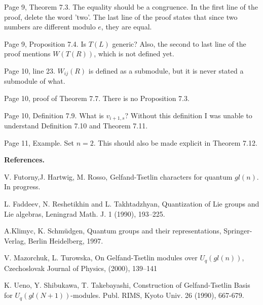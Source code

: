 \documentclass[11pt,fleqn]{article}
\begin{document}
Page 9, Theorem 7.3. The equality should be a congruence. In the first line of 
the proof, delete the word 'two'. The last line of the proof states that since
two numbers are different modulo $e$, they are equal.

Page 9, Proposition 7.4. Is $T(L)$ generic? Also, the second to last line of 
the proof mentions $W(T(R))$, which is not defined yet.

Page 10, line 23. $W_{ij}(R)$ is defined as a submodule, but it is never stated
a submodule of what.

Page 10, proof of Theorem 7.7. There is no Proposition 7.3.

Page 10, Definition 7.9. What is $v_{i+1,s}$? Without this definition I was 
unable to understand Definition 7.10 and Theorem 7.11.

Page 11, Example. Set $n = 2$. This should also be made explicit in 
Theorem 7.12.

\noindent\textbf{References.}

\noindent [11] V. Futorny,J. Hartwig, M. Rosso, Gelfand-Tsetlin characters for 
quantum $gl(n)$. In progress.

\noindent [13] L. Faddeev, N. Reshetikhin and L. Takhtadzhyan, Quantization of 
Lie groups and Lie algebras, Leningrad Math. J. 1 (1990), 193–225.

\noindent [19] A.Klimyc, K. Schmüdgen, Quantum groups and their 
representations, Springer-Verlag, Berlin Heidelberg, 1997.

\noindent [22] V. Mazorchuk, L. Turowska, On Gelfand-Tsetlin modules over 
$U_q (gl(n))$, Czechoslovak Journal of Physics, (2000), 139–141

\noindent [25] K. Ueno, Y. Shibukawa, T. Takebayashi, Construction of 
Gelfand-Tsetlin Basis for $U_q(gl(N +1))$-modules. Publ. RIMS, Kyoto Univ. 26 
(1990), 667-679.
\end{document}
